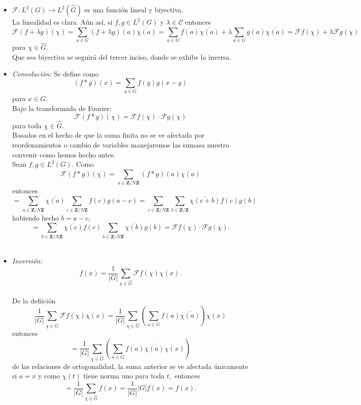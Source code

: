 \documentclass[a4paper,openright,10pt]{article}
\begin{document}
\begin{itemize}
	\item $\mathcal{F}: L^{2}(G) \rightarrow L^{2}(\hat{G})$ es una funci\'on lineal y biyectiva.\\
La linealidad es clara. A\'un as\'i, si $f,g \in L^{2}(G)$ y $\lambda \in \mathcal{C}$ entonces $$\mathcal{F}(f+\lambda g)(\chi)=\sum\limits_{a\in G} (f+\lambda g)(a) \overline{\chi(a)}=\sum\limits_{a\in G} f(a) \overline{\chi(a)} +\lambda\sum\limits_{a\in G} g(a) \overline{\chi(a)}=\mathcal{F}f(\chi)+\lambda\mathcal{F}g(\chi)$$ para $\chi \in \hat{G}.$\\
Que sea biyectiva se seguir\'a del tercer inciso, donde se exhibe la inversa.\\
	\item \textsl{Convoluci\'on:} Se define como $$
(f *g)(x)=\sum\limits_{y\in G} f(y)g(x-y)
$$ para $x\in G.$\\ 
Bajo la transformada de Fourier: $$\mathcal{F}(f*g)(\chi)=\mathcal{F}f(\chi) \cdot \mathcal{F}g(\chi)$$ para toda $\chi \in \hat{G}.$\\

Basados en el hecho de que la suma finita no se ve afectada por reordenamientos o cambio de variables manejaremos las sumasa nuestro convenir como hemos hecho antes.\\ 
Sean $f,g \in L^{2}(G).$ Como $$
\mathcal{F}(f*g)(\chi)=\sum\limits_{a\in \mathbf{Z}/N\mathbf{Z}} (f*g)(a) \overline{\chi(a)}
$$ entonces
$$
=\sum\limits_{a\in \mathbf{Z}/N\mathbf{Z}} \overline{\chi(a)} \sum\limits_{c\in \mathbf{Z}/N\mathbf{Z}} f(c)g(a-c)=\sum\limits_{c\in \mathbf{Z}/N\mathbf{Z}}\sum\limits_{b\in \mathbf{Z}/\mathbf{Z}}\overline{\chi(c+b)}f(c)g(b)
$$ habiendo hecho $b=a-c,$
$$
=\sum\limits_{b\in \mathbf{Z}/N\mathbf{Z}} \overline{\chi(c)}f(c) \sum\limits_{b\in \mathbf{Z}/N\mathbf{Z}}\overline{\chi(b)} g(b)=\mathcal{F}f(\chi)\cdot \mathcal{F}g(\chi).
$$\\

\item \textsl{Inversi\'on:}$$
f(x)=\frac{1}{|G|} \sum\limits_{\chi \in \hat{G}} \mathcal{F}f(\chi) \chi(x).$$\\
De la defiici\'on $$\frac{1}{|G|} \sum\limits_{\chi \in \hat{G}} \mathcal{F}f(\chi) \chi(x)=\frac{1}{|G|} \sum\limits_{\chi \in \hat{G}} (\sum\limits_{a\in G} f(a) \overline{\chi(a)}) \chi(x)$$
entonces $$
=\frac{1}{|G|} \sum\limits_{\chi \in \hat{G}} (\sum\limits_{a\in G} f(a) \overline{\chi(a)} \chi(x))$$de las relaciones de ortogonalidad, la suma anterior se ve afectada \'unicamente si $a=x$ y como $\chi(t)$ tiene norma uno para toda $t,$ entonces $$=\frac{1}{|G|} \sum\limits_{\chi \in \hat{G}} f(x)=\frac{1}{|G|} |G|f(x)=f(x).
$$


\end{itemize}
\end{document}
